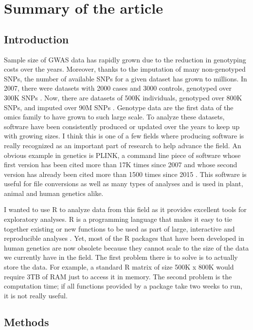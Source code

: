 \section{Summary of the article}

\subsection{Introduction}

Sample size of GWAS data has rapidly grown due to the reduction in genotyping costs over the years. Moreover, thanks to the imputation of many non-genotyped SNPs, the number of available SNPs for a given dataset has grown to millions. In 2007, there were datasets with 2000 cases and 3000 controls, genotyped over 300K SNPs \cite[]{wellcome2007genome}. Now, there are datasets of 500K individuals, genotyped over 800K SNPs, and imputed over 90M SNPs \cite[]{bycroft2017genome}.
Genotype data are the first data of the omics family to have grown to such large scale. To analyze these datasets, software have been consistently produced or updated over the years to keep up with growing sizes. 
I think this is one of a few fields where producing software is really recognized as an important part of research to help advance the field.
An obvious example in genetics is PLINK, a command line piece of software whose first version has been cited more than 17K times since 2007 and whose second version has already been cited more than 1500 times since 2015 \cite[]{purcell2007plink,chang2015second}. This software is useful for file conversions as well as many types of analyses and is used in plant, animal and human genetics alike.

I wanted to use R to analyze data from this field as it provides excellent tools for exploratory analyses. 
R is a programming language that makes it easy to tie together existing or
new functions to be used as part of large, interactive and reproducible
analyses \cite[]{R2018}.
Yet, most of the R packages that have been developed in human genetics are now obsolete because they cannot scale to the size of the data we currently have in the field.
The first problem there is to solve is to actually store the data. For example, a standard R matrix of size 500K x 800K would require 3TB of RAM just to access it in memory.
The second problem is the computation time; if all functions provided by a package take two weeks to run, it is not really useful.

\subsection{Methods}

